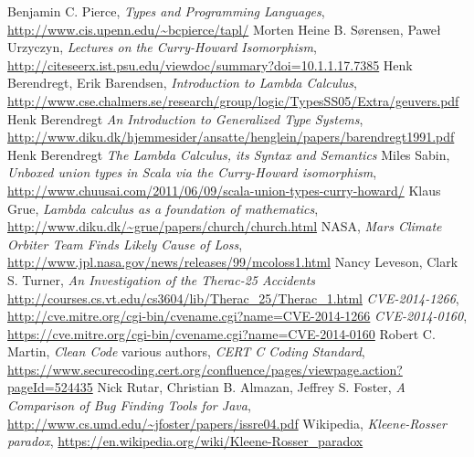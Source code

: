 \documentclass[11pt,twoside,a4paper]{article} %
\begin{document}
\begin{thebibliography}{9}
 Benjamin C. Pierce, \emph{Types and Programming Languages},
\url{http://www.cis.upenn.edu/~bcpierce/tapl/}
 Morten Heine B. Sørensen, Paweł Urzyczyn, \emph{Lectures on the
Curry-Howard Isomorphism}, 
\url{http://citeseerx.ist.psu.edu/viewdoc/summary?doi=10.1.1.17.7385}
 Henk Berendregt, Erik Barendsen, \emph{Introduction to Lambda
Calculus}, 
\url{http://www.cse.chalmers.se/research/group/logic/TypesSS05/Extra/geuvers.pdf}
 Henk Berendregt \emph{An Introduction to Generalized Type Systems}, 
\url{http://www.diku.dk/hjemmesider/ansatte/henglein/papers/barendregt1991.pdf}
 Henk Berendregt \emph{The Lambda Calculus, its Syntax and
Semantics}
 Miles Sabin, \emph{Unboxed union types in Scala via the
Curry-Howard isomorphism}, 
\url{http://www.chuusai.com/2011/06/09/scala-union-types-curry-howard/}
 Klaus Grue, \emph{Lambda calculus as a foundation of mathematics},
\url{http://www.diku.dk/~grue/papers/church/church.html}
 NASA, \emph{Mars Climate Orbiter Team Finds Likely Cause of Loss}, 
\url{http://www.jpl.nasa.gov/news/releases/99/mcoloss1.html}
 Nancy Leveson, Clark S. Turner, 
\emph{An Investigation of the Therac-25 Accidents}
\url{http://courses.cs.vt.edu/cs3604/lib/Therac_25/Therac_1.html}
 \emph{CVE-2014-1266},
\url{http://cve.mitre.org/cgi-bin/cvename.cgi?name=CVE-2014-1266}
 \emph{CVE-2014-0160}, 
\url{https://cve.mitre.org/cgi-bin/cvename.cgi?name=CVE-2014-0160}
 Robert C. Martin, \emph{Clean Code}
 various authors, \emph{CERT C Coding Standard}, 
\url{https://www.securecoding.cert.org/confluence/pages/viewpage.action?pageId=524435}
 Nick Rutar, Christian B. Almazan, Jeffrey S. Foster, \emph{A
Comparison of Bug Finding Tools for Java}, 
\url{http://www.cs.umd.edu/~jfoster/papers/issre04.pdf}
 Wikipedia, \emph{Kleene-Rosser paradox},
\url{https://en.wikipedia.org/wiki/Kleene-Rosser_paradox}
\end{thebibliography}
\end{document}
